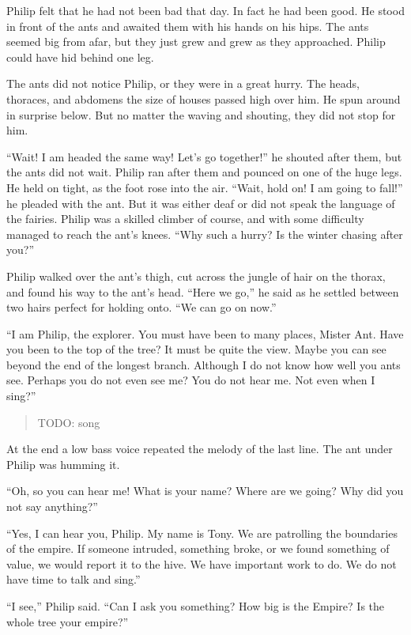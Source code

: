 \documentclass[10pt, draft]{memoir}
\begin{document}
Philip felt that he had not been bad that day. In fact he had been good. He stood in front of the ants and awaited them with his hands on his hips. The ants seemed big from afar, but they just grew and grew as they approached. Philip could have hid behind one leg.

The ants did not notice Philip, or they were in a great hurry. The heads, thoraces, and abdomens the size of houses passed high over him. He spun around in surprise below. But no matter the waving and shouting, they did not stop for him.

``Wait! I am headed the same way! Let's go together!'' he shouted after them, but the ants did not wait. Philip ran after them and pounced on one of the huge legs. He held on tight, as the foot rose into the air. ``Wait, hold on! I am going to fall!'' he pleaded with the ant. But it was either deaf or did not speak the language of the fairies. Philip was a skilled climber of course, and with some difficulty managed to reach the ant's knees. ``Why such a hurry? Is the winter chasing after you?''

Philip walked over the ant's thigh, cut across the jungle of hair on the thorax, and found his way to the ant's head. ``Here we go,'' he said as he settled between two hairs perfect for holding onto. ``We can go on now.''

``I am Philip, the explorer. You must have been to many places, Mister Ant. Have you been to the top of the tree? It must be quite the view. Maybe you can see beyond the end of the longest branch. Although I do not know how well you ants see. Perhaps you do not even see me? You do not hear me. Not even when I sing?''


\begin{verse}
TODO: song
\end{verse}


At the end a low bass voice repeated the melody of the last line. The ant under Philip was humming it.

``Oh, so you can hear me! What is your name? Where are we going? Why did you not say anything?''

``Yes, I can hear you, Philip. My name is Tony. We are patrolling the boundaries of the empire. If someone intruded, something broke, or we found something of value, we would report it to the hive. We have important work to do. We do not have time to talk and sing.”

``I see,'' Philip said. ``Can I ask you something? How big is the Empire? Is the whole tree your empire?''
\end{document}
